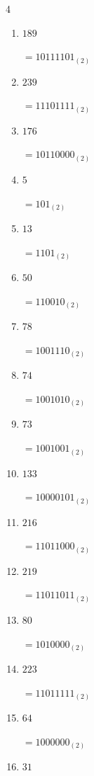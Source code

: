 \begin{multicols}{4}
\begin{enumerate}
        $=1100100_{(2)}$

\columnbreak %

  \item $189$

        $=10111101_{(2)}$

  \item $239$

        $=11101111_{(2)}$

  \item $176$

        $=10110000_{(2)}$

  \item $5$

        $=101_{(2)}$

  \item $13$

        $=1101_{(2)}$

  \item $50$

        $=110010_{(2)}$

  \item $78$

        $=1001110_{(2)}$

  \item $74$

        $=1001010_{(2)}$

  \item $73$

        $=1001001_{(2)}$

  \item $133$

        $=10000101_{(2)}$

  \item $216$

        $=11011000_{(2)}$

  \item $219$

        $=11011011_{(2)}$

  \item $80$

        $=1010000_{(2)}$

  \item $223$

        $=11011111_{(2)}$

  \item $64$

        $=1000000_{(2)}$

\columnbreak %

  \item $31$


\end{enumerate}
\end{multicols}
